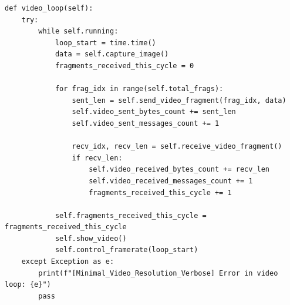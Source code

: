 \begin{lstlisting}[style=pythonstyle, caption={Método \texttt{video\_loop()} de \textit{Minimal\_Video\_Resolution\_verbose}.}, label={lst:video_loop_minimal_video_resolution_verbose}]
def video_loop(self):
    try:
        while self.running:
            loop_start = time.time()
            data = self.capture_image()
            fragments_received_this_cycle = 0

            for frag_idx in range(self.total_frags):
                sent_len = self.send_video_fragment(frag_idx, data)
                self.video_sent_bytes_count += sent_len
                self.video_sent_messages_count += 1

                recv_idx, recv_len = self.receive_video_fragment()
                if recv_len:
                    self.video_received_bytes_count += recv_len
                    self.video_received_messages_count += 1
                    fragments_received_this_cycle += 1

            self.fragments_received_this_cycle = fragments_received_this_cycle
            self.show_video()
            self.control_framerate(loop_start)
    except Exception as e:
        print(f"[Minimal_Video_Resolution_Verbose] Error in video loop: {e}")
        pass
\end{lstlisting}
\vspace{\baselineskip}


